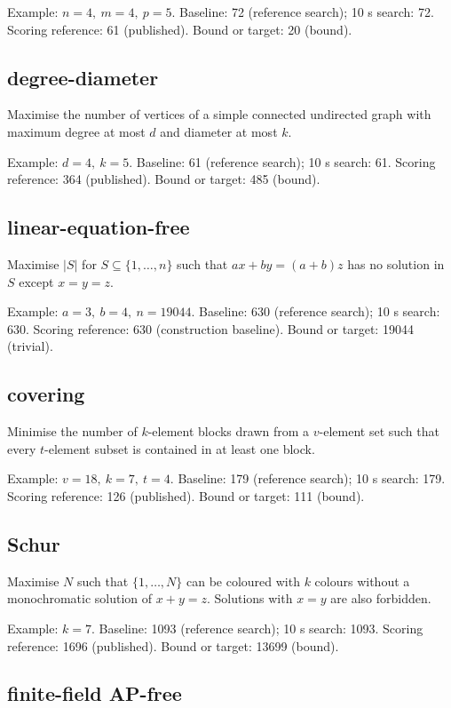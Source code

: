 Example: $n=4,\ m=4,\ p=5$. Baseline: 72 (reference search); 10 s search: 72. Scoring reference: 61 (published). Bound or target: 20 (bound).

\subsection{degree-diameter}

Maximise the number of vertices of a simple connected undirected graph with maximum degree at most $d$ and diameter at most $k$.

Example: $d=4,\ k=5$. Baseline: 61 (reference search); 10 s search: 61. Scoring reference: 364 (published). Bound or target: 485 (bound).

\subsection{linear-equation-free}

Maximise $|S|$ for $S\subseteq\{1,\ldots,n\}$ such that $ax+by=(a+b)z$ has no solution in $S$ except $x=y=z$.

Example: $a=3,\ b=4,\ n=19044$. Baseline: 630 (reference search); 10 s search: 630. Scoring reference: 630 (construction baseline). Bound or target: 19044 (trivial).

\subsection{covering}

Minimise the number of $k$-element blocks drawn from a $v$-element set such that every $t$-element subset is contained in at least one block.

Example: $v=18,\ k=7,\ t=4$. Baseline: 179 (reference search); 10 s search: 179. Scoring reference: 126 (published). Bound or target: 111 (bound).

\subsection{Schur}

Maximise $N$ such that $\{1,\ldots,N\}$ can be coloured with $k$ colours without a monochromatic solution of $x+y=z$. Solutions with $x=y$ are also forbidden.

Example: $k=7$. Baseline: 1093 (reference search); 10 s search: 1093. Scoring reference: 1696 (published). Bound or target: 13699 (bound).

\subsection{finite-field AP-free}

